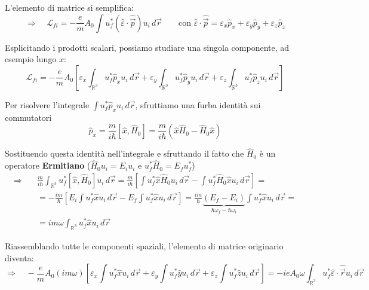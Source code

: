 \documentclass[11pt, a4paper]{article}
\begin{document}
L'elemento di matrice si semplifica: %
\begin{equation}
    \Rightarrow \quad \mathcal{L}_{fi} = -\frac{e}{m} A_0 \int u_f^* (\hat{\varepsilon} \cdot \hat{\vec{p}}) u_i \, d\vec{r} \qquad \text{con } \hat{\varepsilon} \cdot \hat{\vec{p}} = \varepsilon_x \hat{p}_x + \varepsilon_y \hat{p}_y + \varepsilon_z \hat{p}_z %
\end{equation}

\noindent
Esplicitando i prodotti scalari, possiamo studiare una singola componente, ad esempio lungo $x$: %
\begin{equation*}
    \mathcal{L}_{fi} = -\frac{e}{m} A_0 \left[ \varepsilon_x \int_{\mathbb{R}^3} u_f^* \hat{p}_x u_i \, d\vec{r} + \varepsilon_y \int_{\mathbb{R}^3} u_f^* \hat{p}_y u_i \, d\vec{r} + \varepsilon_z \int_{\mathbb{R}^3} u_f^* \hat{p}_z u_i \, d\vec{r} \right] %
\end{equation*}

Per risolvere l'integrale $\int u_f^* \hat{p}_x u_i \, d\vec{r}$, sfruttiamo una furba identità sui commutatori %
\begin{equation*}
    \hat{p}_x = \frac{m}{i\hbar} [\hat{x}, \hat{H}_0] = \frac{m}{i\hbar} (\hat{x}\hat{H}_0 - \hat{H}_0\hat{x}) %
\end{equation*}

\noindent
Sostituendo questa identità nell'integrale e sfruttando il fatto che $\hat{H}_0$ è un operatore \textbf{Ermitiano} ($\hat{H}_0 u_i = E_i u_i$ e $u_f^* \hat{H}_0 = E_f u_f^*$) %
\begin{align*}
    \Rightarrow \quad & \frac{m}{i\hbar} \int_{\mathbb{R}^3} u_f^* [\hat{x}, \hat{H}_0] u_i \, d\vec{r} = \frac{m}{i\hbar} \left[ \int u_f^* \hat{x} \hat{H}_0 u_i \, d\vec{r} - \int u_f^* \hat{H}_0 \hat{x} u_i \, d\vec{r} \right] = \\ %
    &= -\frac{im}{\hbar} \left[ E_i \int u_f^* \hat{x} u_i \, d\vec{r} - E_f \int u_f^* \hat{x} u_i \, d\vec{r} \right] = \frac{im}{\hbar} \underbrace{(E_f - E_i)}_{\hbar\omega_f - \hbar\omega_i} \int u_f^* \hat{x} u_i \, d\vec{r} = \\ %
    &= im\omega \int_{\mathbb{R}^3} u_f^* \hat{x} u_i \, d\vec{r} %
\end{align*}

\noindent
Riassemblando tutte le componenti spaziali, l'elemento di matrice originario diventa: %
\begin{equation*}
    \Rightarrow \quad -\frac{e}{m} A_0 (im\omega) \left[ \varepsilon_x \int u_f^* \hat{x} u_i \, d\vec{r} + \varepsilon_y \int u_f^* \hat{y} u_i \, d\vec{r} + \varepsilon_z \int u_f^* \hat{z} u_i \, d\vec{r} \right] = -i e A_0 \omega \int_{\mathbb{R}^3} u_f^* \hat{\varepsilon} \cdot \hat{\vec{r}} u_i \, d\vec{r} %
\end{equation*}
\end{document}
